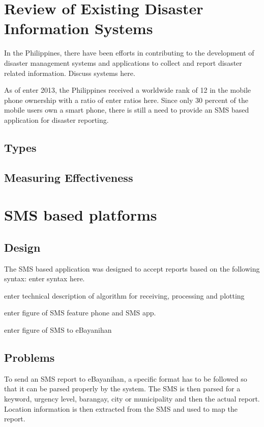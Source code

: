 \documentclass{acm_proc_article-sp}
\begin{document}
\section{Review of Existing Disaster Information Systems}

In the Philippines, there have been efforts in contributing to the development of disaster management systems and applications to collect and report disaster related information. Discuss systems here.

As of enter 2013, the Philippines received a worldwide rank of 12 in the mobile phone ownership with a ratio of enter ratios here. Since only 30 percent of the mobile users own a smart phone, there is still a need to provide an SMS based application for disaster reporting.

\subsection{Types}

\subsection{Measuring Effectiveness}

\section{SMS based platforms}
\subsection{Design}
The SMS based application was designed to accept reports based on the following syntax:
enter syntax here.

enter technical description of algorithm for receiving, processing and plotting

enter figure of SMS feature phone and SMS app.

enter figure of SMS to eBayanihan

\subsection{Problems}

To send an SMS report to eBayanihan, a specific format has to be followed so that it can be parsed properly by the system. The SMS is then parsed for a keyword, urgency level, barangay, city or municipality and then the actual report. Location information is then extracted from the SMS and used to map the report. 
\end{document}
